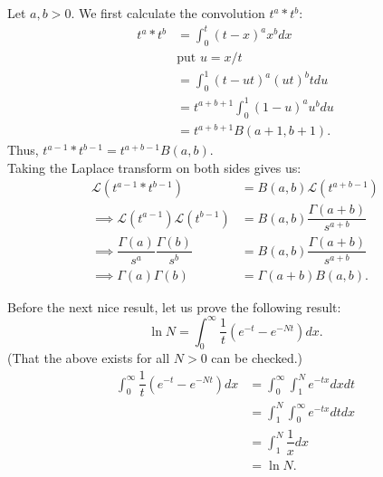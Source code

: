 \begin{mdframed}[style=boxstyle, frametitle={The Beta-Gamma Relation}]
	Let $a, b > 0.$ We first calculate the convolution $t^a*t^b:$
	\begin{align*} 
		t^a * t^b &= \int_{0}^{t} (t - x)^ax^b dx\\
		& \text{put }u = x/t\\
		&= \int_{0}^{1} (t - ut)^a(ut)^b tdu\\
		&= t^{a + b + 1}\int_{0}^{1} (1 - u)^au^b du\\
		&= t^{a + b + 1}B(a + 1, b + 1).
	\end{align*}
	Thus, $t^{a - 1}*t^{b - 1} = t^{a + b - 1}B(a, b).$\\
	Taking the Laplace transform on both sides gives us:
	\begin{align*} 
		\mathcal{L}(t^{a - 1}*t^{b - 1}) &= B(a, b)\mathcal{L}(t^{a + b - 1})\\
		\implies \mathcal{L}(t^{a - 1})\mathcal{L}(t^{b - 1}) &= B(a, b)\dfrac{\Gamma(a + b)}{s^{a + b}}\\
		\implies \dfrac{\Gamma(a)}{s^{a}}\dfrac{\Gamma(b)}{s^b} &= B(a, b)\dfrac{\Gamma(a + b)}{s^{a + b}}\\
		\implies \Gamma(a)\Gamma(b) &= \Gamma(a + b)B(a, b).
	\end{align*}
\end{mdframed}

\begin{mdframed}[style=boxstyle, frametitle={A little integral}]
	Before the next nice result, let us prove the following result:
	\begin{equation} \label{eq:logint}
		\ln N = \int_{0}^{\infty} \dfrac{1}{t}(e^{-t} - e^{-Nt}) dx.
	\end{equation}
	(That the above exists for all $N > 0$ can be checked.)\\
	\begin{align*} 
		\int_{0}^{\infty} \dfrac{1}{t}(e^{-t} - e^{-Nt}) dx &= \int_{0}^{\infty} \int_{1}^{N} e^{-tx} dx dt\\
		&= \int_{1}^{N} \int_{0}^{\infty} e^{-tx} dt dx\\
		&= \int_{1}^{N} \dfrac{1}{x} dx\\
		&= \ln N.
	\end{align*}
\end{mdframed}

